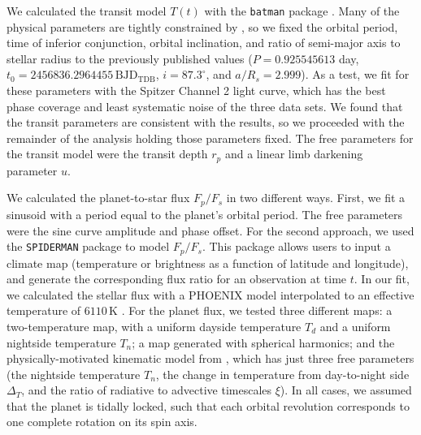 \documentclass[twocolumn]{aastex61}
\begin{document}
We calculated the transit model $T(t)$ with the \texttt{batman} package \citep{kreidberg15a}. Many of the physical parameters are tightly constrained by \cite{southworth15}, so we fixed the orbital period, time of inferior conjunction, orbital inclination, and ratio of semi-major axis to stellar radius to the previously published values ($P = 0.925545613$ day, $t_0 = 2456836.2964455\,\mathrm{BJD_{TDB}}$, $i = 87.3^\circ$, and $a/R_s = 2.999$). As a test, we fit for these parameters with the Spitzer Channel 2 light curve, which has the best phase coverage and least systematic noise of the three data sets. We found that the transit parameters are consistent with the \cite{southworth15} results, so we proceeded with the remainder of the analysis holding those parameters fixed.  The free parameters for the transit model were the transit depth $r_p$ and a linear limb darkening parameter $u$. 

We calculated the planet-to-star flux $F_p/F_s$ in two different ways. First, we fit a sinusoid with a period equal to the planet's orbital period. The free parameters were the sine curve amplitude and phase offset. For the second approach, we used the \texttt{SPIDERMAN} package \citep{louden17} to model $F_p/F_s$. This package allows users to input a climate map (temperature or brightness as a function of latitude and longitude), and generate the corresponding flux ratio for an observation at time $t$. In our fit, we calculated the stellar flux with a PHOENIX model \citep{husser13} interpolated to an effective temperature of $6110\,\mathrm{K}$ \citep{gillon14}.  For the planet flux, we tested three different maps: a two-temperature map, with a uniform dayside temperature $T_d$ and a uniform nightside temperature $T_n$; a map generated with spherical harmonics; and the physically-motivated kinematic model from \cite{zhang17}, which has just three free parameters (the nightside temperature $T_n$, the change in temperature from day-to-night side $\Delta_T$, and the ratio of radiative to advective timescales $\xi$).  In all cases, we assumed that the planet is tidally locked, such that each orbital revolution corresponds to one complete rotation on its spin axis. 
\end{document}
